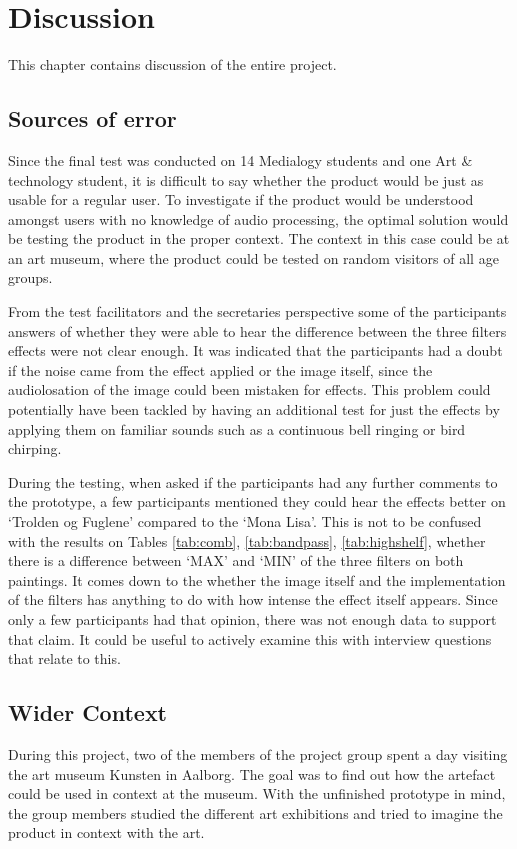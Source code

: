 \chapter{Discussion}\label{ch:discussion}
This chapter contains discussion of the entire project.

\section{Sources of error}
Since the final test was conducted on 14 Medialogy students and one Art \& technology student, it is difficult to say whether the product would be just as usable for a regular user. To investigate if the product would be understood amongst users with no knowledge of audio processing, the optimal solution would be testing the product in the proper context. The context in this case could be at an art museum, where the product could be tested on random visitors of all age groups.

From the test facilitators and the secretaries perspective some of the participants answers of whether they were able to hear the difference between the three filters effects were not clear enough. It was indicated that the participants had a doubt if the noise came from the effect applied or the image itself, since the audiolosation of the image could been mistaken for effects. This problem could potentially have been tackled by having an additional test for just the effects by applying them on familiar sounds such as a continuous bell ringing or bird chirping. 

During the testing, when asked if the participants had any further comments to the prototype, a few participants mentioned they could hear the effects better on ‘Trolden og Fuglene’ compared to the ‘Mona Lisa’. This is not to be confused with the results on Tables \ref{tab:comb}, \ref{tab:bandpass}, \ref{tab:highshelf}, whether there is a difference between ‘MAX’ and ‘MIN’ of the three filters on both paintings. It comes down to the whether the image itself and the implementation of the filters has anything to do with how intense the effect itself appears. Since only a few participants had that opinion, there was not enough data to support that claim. It could be useful to actively examine this with interview questions that relate to this.

\section{Wider Context}
During this project, two of the members of the project group spent a day visiting the art museum Kunsten in Aalborg. The goal was to find out how the artefact could be used in context at the museum. With the unfinished prototype in mind, the group members studied the different art exhibitions and tried to imagine the product in context with the art.

